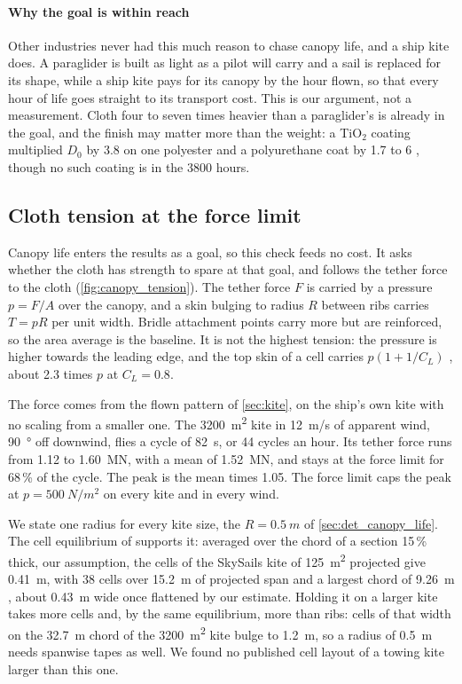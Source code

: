 \paragraph{Why the goal is within reach} Other industries never had this much reason to chase canopy life, and a ship kite does. A paraglider is built as light as a pilot will carry and a sail is replaced for its shape, while a ship kite pays for its canopy by the hour flown, so that every hour of life goes straight to its transport cost. This is our argument, not a measurement. Cloth four to seven times heavier than a paraglider's is already in the goal, and the finish may matter more than the weight: a TiO$_2$ coating multiplied $D_0$ by 3.8 on one polyester \citep{hunt2022} and a polyurethane coat by 1.7 to 6 \citep{uzumcu2024}, though no such coating is in the \num{3800} hours.

\subsection{Cloth tension at the force limit}
\label{sec:cloth_check}

Canopy life enters the results as a goal, so this check feeds no cost. It asks whether the cloth has strength to spare at that goal, and follows the tether force to the cloth (\cref{fig:canopy_tension}). The tether force $F$ is carried by a pressure $p=F/A$ over the canopy, and a skin bulging to radius $R$ between ribs carries $T=pR$ per unit width. Bridle attachment points carry more but are reinforced, so the area average is the baseline. It is not the highest tension: the pressure is higher towards the leading edge, and the top skin of a cell carries $p(1+1/C_L)$ \citep{wang2018}, about 2.3 times $p$ at $C_L=0.8$.

The force comes from the flown pattern of \cref{sec:kite}, on the ship's own kite with no scaling from a smaller one. The \SI{3200}{m^2} kite in \SI{12}{m/s} of apparent wind, \SI{90}{\degree} off downwind, flies a cycle of \SI{82}{s}, or 44 cycles an hour. Its tether force runs from 1.12 to \SI{1.60}{MN}, with a mean of \SI{1.52}{MN}, and stays at the force limit for 68\,\% of the cycle. The peak is the mean times 1.05. The force limit caps the peak at $p=\SI{500}{N/m^2}$ on every kite and in every wind.

We state one radius for every kite size, the $R=\SI{0.5}{m}$ of \cref{sec:det_canopy_life}. The cell equilibrium of \citet{wang2018} supports it: averaged over the chord of a section 15\,\% thick, our assumption, the cells of the SkySails kite of \SI{125}{m^2} projected give \SI{0.41}{m}, with 38 cells over \SI{15.2}{m} of projected span and a largest chord of \SI{9.26}{m} \citep{folkersma2020}, about \SI{0.43}{m} wide once flattened by our estimate. Holding it on a larger kite takes more cells and, by the same equilibrium, more than ribs: cells of that width on the \SI{32.7}{m} chord of the \SI{3200}{m^2} kite bulge to \SI{1.2}{m}, so a radius of \SI{0.5}{m} needs spanwise tapes as well. We found no published cell layout of a towing kite larger than this one.

